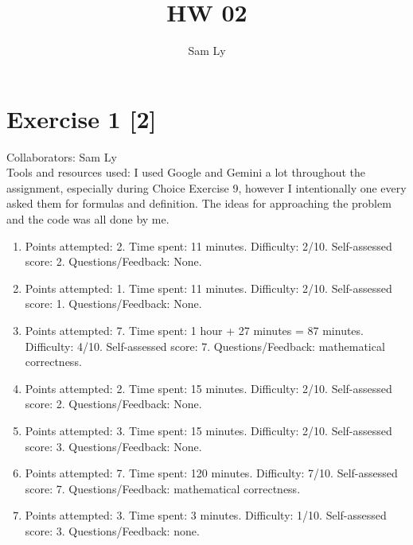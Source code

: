 \documentclass{article}
\title{HW 02}
\author{Sam Ly}
\begin{document}
\maketitle

\section*{Exercise 1 [2]}
Collaborators: Sam Ly
\\
Tools and resources used: I used Google and Gemini a lot throughout the assignment, 
especially during Choice Exercise 9, however I intentionally one every asked them 
for formulas and definition. The ideas for approaching the problem and the code 
was all done by me. 
\\
\begin{enumerate}
    \item[Exercise 1]
    {\color{red} Points attempted: 2}.
    {\color{blue} Time spent: 11 minutes}.
    {\color{brown} Difficulty: 2/10}.
    {\color{green!50!black} Self-assessed score: 2}.
    {\color{magenta} Questions/Feedback: None.}

    \item[Exercise 2]
    {\color{red} Points attempted: 1}.
    {\color{blue} Time spent: 11 minutes}.
    {\color{brown} Difficulty: 2/10}.
    {\color{green!50!black} Self-assessed score: 1}.
    {\color{magenta} Questions/Feedback: None.}

    \item[Exercise 3]
    {\color{red} Points attempted: 7}.
    {\color{blue} Time spent: 1 hour + 27 minutes = 87 minutes}.
    {\color{brown} Difficulty: 4/10}.
    {\color{green!50!black} Self-assessed score: 7}.
    {\color{magenta} Questions/Feedback: mathematical correctness.}

    \item[Choice Exercise 4]
    {\color{red} Points attempted: 2}.
    {\color{blue} Time spent: 15 minutes}.
    {\color{brown} Difficulty: 2/10}.
    {\color{green!50!black} Self-assessed score: 2}.
    {\color{magenta} Questions/Feedback: None.}

    \item[Choice Exercise 6]
    {\color{red} Points attempted: 3}.
    {\color{blue} Time spent: 15 minutes}.
    {\color{brown} Difficulty: 2/10}.
    {\color{green!50!black} Self-assessed score: 3}.
    {\color{magenta} Questions/Feedback: None.}

    \item[Choice Exercise 9]
    {\color{red} Points attempted: 7}.
    {\color{blue} Time spent: 120 minutes}.
    {\color{brown} Difficulty: 7/10}.
    {\color{green!50!black} Self-assessed score: 7}.
    {\color{magenta} Questions/Feedback: mathematical correctness.}

    \item[Choice Exercise 10]
    {\color{red} Points attempted: 3}.
    {\color{blue} Time spent: 3 minutes}.
    {\color{brown} Difficulty: 1/10}.
    {\color{green!50!black} Self-assessed score: 3}.
    {\color{magenta} Questions/Feedback: none.}
\end{enumerate}
\pagebreak
    
\end{document}
